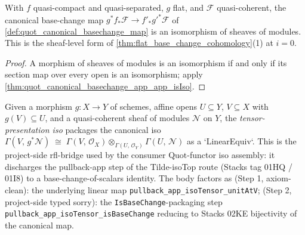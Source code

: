 \begin{theorem}
  \label{thm:quot_canonical_basechange_isIso}
  With \(f\) quasi-compact and quasi-separated, \(g\) flat, and
  \(\mathcal{F}\) quasi-coherent, the canonical base-change map
  \(g^* f_* \mathcal{F} \to f'_* g'^* \mathcal{F}\) of
  \cref{def:quot_canonical_basechange_map} is an isomorphism of sheaves of
  modules. This is the sheaf-level form of
  \cref{thm:flat_base_change_cohomology}(1) at \(i = 0\).
\end{theorem}
\begin{proof}\leanok
  A morphism of sheaves of modules is an isomorphism if and only if its
  section map over every open is an isomorphism; apply
  \cref{thm:quot_canonical_basechange_app_app_isIso}.
\end{proof}

\begin{definition}
  \label{def:quot_pullback_app_isoTensor}
  Given a morphism \(g : X \to Y\) of schemes, affine opens
  \(U \subseteq Y\), \(V \subseteq X\) with \(g(V) \subseteq U\), and a
  quasi-coherent sheaf of modules \(\mathcal{N}\) on \(Y\), the
  \emph{tensor-presentation iso} packages the canonical iso
  \(\Gamma(V,\, g^* \mathcal{N}) \;\cong\;
   \Gamma(V,\, \mathcal{O}_X) \otimes_{\Gamma(U,\, \mathcal{O}_Y)}
     \Gamma(U,\, \mathcal{N})\)
  as a `LinearEquiv`. This is the project-side rfl-bridge used by the
  consumer \(\text{Quot}\)-functor iso assembly: it discharges the
  pullback-app step of the Tilde-isoTop route (Stacks tag 01HQ / 01I8)
  to a base-change-of-scalars identity. The body factors as
  (Step 1, axiom-clean): the underlying linear map
  \texttt{pullback\_app\_isoTensor\_unitAtV};
  (Step 2, project-side typed sorry): the
  \texttt{IsBaseChange}-packaging step
  \texttt{pullback\_app\_isoTensor\_isBaseChange} reducing to
  Stacks 02KE bijectivity of the canonical map.
\end{definition}


